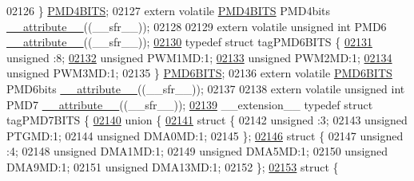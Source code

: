 \begin{DoxyCode}
02126 \} \hyperlink{a00014_da/d36/a00650}{PMD4BITS};
02127 \textcolor{keyword}{extern} \textcolor{keyword}{volatile} \hyperlink{a00014_da/d36/a00650}{PMD4BITS} PMD4bits \hyperlink{a00015_a493c46f03454991ccc5aa7a6e1dfb2a7}{\_\_attribute\_\_}((\_\_sfr\_\_));
02128 
02129 \textcolor{keyword}{extern} \textcolor{keyword}{volatile} \textcolor{keywordtype}{unsigned} \textcolor{keywordtype}{int}  PMD6 \hyperlink{a00015_a493c46f03454991ccc5aa7a6e1dfb2a7}{\_\_attribute\_\_}((\_\_sfr\_\_));
\hypertarget{a00015_source_l02130}{}\hyperlink{a00014}{02130} \textcolor{keyword}{typedef} \textcolor{keyword}{struct }tagPMD6BITS \{
\hypertarget{a00015_source_l02131}{}\hyperlink{a00014_adf71f3d8410c1f1dbbc96680a92c49af}{02131}   \textcolor{keywordtype}{unsigned} :8;
\hypertarget{a00015_source_l02132}{}\hyperlink{a00014_ae3db28ac501d2a3bb7250a95e88933ec}{02132}   \textcolor{keywordtype}{unsigned} PWM1MD:1;
\hypertarget{a00015_source_l02133}{}\hyperlink{a00014_abc1282116bc7aa439b2516a747060404}{02133}   \textcolor{keywordtype}{unsigned} PWM2MD:1;
\hypertarget{a00015_source_l02134}{}\hyperlink{a00014_a3365bf3675c5b06b0eaa0d64a2a58fe2}{02134}   \textcolor{keywordtype}{unsigned} PWM3MD:1;
02135 \} \hyperlink{a00014_de/d33/a00651}{PMD6BITS};
02136 \textcolor{keyword}{extern} \textcolor{keyword}{volatile} \hyperlink{a00014_de/d33/a00651}{PMD6BITS} PMD6bits \hyperlink{a00015_a493c46f03454991ccc5aa7a6e1dfb2a7}{\_\_attribute\_\_}((\_\_sfr\_\_));
02137 
02138 \textcolor{keyword}{extern} \textcolor{keyword}{volatile} \textcolor{keywordtype}{unsigned} \textcolor{keywordtype}{int}  PMD7 \hyperlink{a00015_a493c46f03454991ccc5aa7a6e1dfb2a7}{\_\_attribute\_\_}((\_\_sfr\_\_));
\hypertarget{a00015_source_l02139}{}\hyperlink{a00014}{02139} \_\_extension\_\_ \textcolor{keyword}{typedef} \textcolor{keyword}{struct }tagPMD7BITS \{
\hypertarget{a00015_source_l02140}{}\hyperlink{a00015}{02140}   \textcolor{keyword}{union }\{
\hypertarget{a00015_source_l02141}{}\hyperlink{a00015}{02141}     \textcolor{keyword}{struct }\{
02142       \textcolor{keywordtype}{unsigned} :3;
02143       \textcolor{keywordtype}{unsigned} PTGMD:1;
02144       \textcolor{keywordtype}{unsigned} DMA0MD:1;
02145     \};
\hypertarget{a00015_source_l02146}{}\hyperlink{a00015}{02146}     \textcolor{keyword}{struct }\{
02147       \textcolor{keywordtype}{unsigned} :4;
02148       \textcolor{keywordtype}{unsigned} DMA1MD:1;
02149       \textcolor{keywordtype}{unsigned} DMA5MD:1;
02150       \textcolor{keywordtype}{unsigned} DMA9MD:1;
02151       \textcolor{keywordtype}{unsigned} DMA13MD:1;
02152     \};
\hypertarget{a00015_source_l02153}{}\hyperlink{a00015}{02153}     \textcolor{keyword}{struct }\{

\end{DoxyCode}
